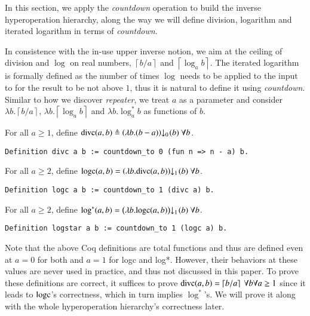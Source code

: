 In this section, we apply the \emph{countdown} operation to build the inverse hyperoperation hierarchy, along the way we will define division, logarithm and iterated logarithm in terms of \emph{countdown}.

In consistence with the in-use upper inverse notion, we aim at the ceiling of division and $\log$ on real numbers, $\left\lceil b/a \right\rceil$ and $\left\lceil \log_ab \right\rceil$. The iterated logarithm is formally defined as the number of times $\log$ needs to be applied to the input to for the result to be not above $1$, thus it is natural to define it using \emph{countdown}.
Similar to how we discover \emph{repeater}, we treat $a$ as a parameter and consider $\lambda b.\left\lceil b/a \right\rceil$, $\lambda b.\left\lceil \log_ab \right\rceil$ and $\lambda b. \log^*_ab$ as functions of $b$. 
\begin{defn} \label{defn: divc}
	For all $a\ge 1$, define $\divc(a, b) \triangleq \cdt{\left(\lambda b. (b-a)\right)}{0}(b) \ \forall b$.
\begin{lstlisting}
Definition divc a b := countdown_to 0 (fun n => n - a) b.
\end{lstlisting}\vspace*{-0.5\baselineskip}
\end{defn}
\begin{defn} \label{defn: logc}
	For all $a\ge 2$, define $\logc(a, b) = \cdt{\left(\lambda b. \divc(a, b)\right)}{1}(b) \ \forall b$.
\begin{lstlisting}
Definition logc a b := countdown_to 1 (divc a) b.
\end{lstlisting}\vspace*{-0.5\baselineskip}
\end{defn}
\begin{defn} \label{defn: log*}
	For all $a\ge 2$, define $\log^*(a, b) = \cdt{\left(\lambda b. \logc(a, b)\right)}{1}(b) \ \forall b$.
\begin{lstlisting}
Definition logstar a b := countdown_to 1 (logc a) b.
\end{lstlisting}\vspace*{-0.5\baselineskip}
\end{defn}
Note that the above Coq definitions are total functions and thus are defined even at $a = 0$ for both and $a = 1$ for logc and log*. However, their behaviors at these values are never used in practice, and thus not discussed in this paper. To prove these definitions are correct, it suffices to prove
$\divc(a, b) = \left\lceil b/a \right\rceil \ \forall b\forall a\ge 1$ since it leads to $\text{logc}$'s correctness, which in turn implies $\log^*$'s. We will prove it along with the whole hyperoperation hierarchy's correctness later.
